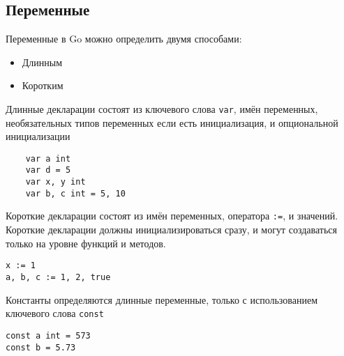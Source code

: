 \subsection{Переменные}
Переменные в Go можно определить двумя способами:
\begin{itemize}
    \item Длинным
    \item Коротким
\end{itemize}

Длинные декларации состоят из ключевого слова \verb|var|, имён переменных, необязательных типов переменных если есть инициализация, и опциональной инициализации
\begin{verbatim}
    var a int
    var d = 5
    var x, y int
    var b, c int = 5, 10
\end{verbatim}


Короткие декларации состоят из имён переменных, оператора \verb|:=|, и значений. Короткие декларации должны инициализироваться сразу, и могут создаваться только на уровне функций и методов.
\begin{verbatim}
x := 1
a, b, c := 1, 2, true
\end{verbatim}

Константы определяются длинные переменные, только с использованием ключевого слова \verb|const|
\begin{verbatim}
const a int = 573
const b = 5.73
\end{verbatim}
